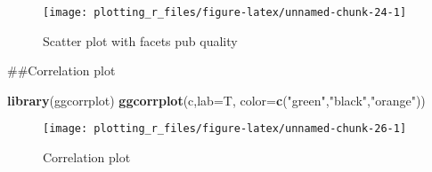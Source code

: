 \documentclass[
]{book}
\newenvironment{Shaded}{\begin{snugshade}}{\end{snugshade}}
\newcommand{\CommentTok}[1]{\textcolor[rgb]{0.56,0.35,0.01}{\textit{#1}}}
\newcommand{\DataTypeTok}[1]{\textcolor[rgb]{0.13,0.29,0.53}{#1}}
\newcommand{\KeywordTok}[1]{\textcolor[rgb]{0.13,0.29,0.53}{\textbf{#1}}}
\newcommand{\NormalTok}[1]{#1}
\newcommand{\OperatorTok}[1]{\textcolor[rgb]{0.81,0.36,0.00}{\textbf{#1}}}
\newcommand{\StringTok}[1]{\textcolor[rgb]{0.31,0.60,0.02}{#1}}
\begin{document}
\begin{figure}

{\centering \texttt{[image: plotting\_r\_files/figure-latex/unnamed-chunk-24-1]} 

}

\caption{Scatter plot with facets pub quality}\label{fig:unnamed-chunk-24}
\end{figure}

\#\#Correlation plot

\begin{Shaded}
\end{Shaded}

\begin{Shaded}
\begin{Highlighting}[]
\KeywordTok{library}\NormalTok{(ggcorrplot)}
\KeywordTok{ggcorrplot}\NormalTok{(c,}\DataTypeTok{lab=}\NormalTok{T, }\DataTypeTok{color=}\KeywordTok{c}\NormalTok{(}\StringTok{"green"}\NormalTok{,}\StringTok{"black"}\NormalTok{,}\StringTok{"orange"}\NormalTok{))}
\end{Highlighting}
\end{Shaded}

\begin{figure}

{\centering \texttt{[image: plotting\_r\_files/figure-latex/unnamed-chunk-26-1]} 

}

\caption{Correlation plot}\label{fig:unnamed-chunk-26}
\end{figure}

  
\end{document}
